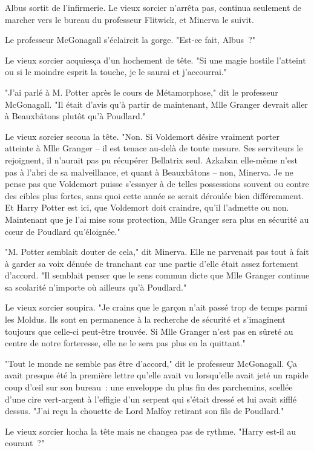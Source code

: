 Albus sortit de l'infirmerie. Le vieux sorcier n'arrêta pas, continua seulement de marcher vers le bureau du professeur Flitwick, et Minerva le suivit.

Le professeur McGonagall s'éclaircit la gorge. "Est-ce fait, Albus~?"

Le vieux sorcier acquiesça d'un hochement de tête. "Si une magie hostile l'atteint ou si le moindre esprit la touche, je le saurai et j'accourrai."

"J'ai parlé à M. Potter après le cours de Métamorphose," dit le professeur McGonagall. "Il était d'avis qu'à partir de maintenant, Mlle Granger devrait aller à Beauxbâtons plutôt qu'à Poudlard."

Le vieux sorcier secoua la tête. "Non. Si Voldemort désire vraiment porter atteinte à Mlle Granger -- il est tenace au-delà de toute mesure. Ses serviteurs le rejoignent, il n'aurait pas pu récupérer Bellatrix seul. Azkaban elle-même n'est pas à l'abri de sa malveillance, et quant à Beauxbâtons -- non, Minerva. Je ne pense pas que Voldemort puisse s'essayer à de telles possessions souvent ou contre des cibles plus fortes, sans quoi cette année se serait déroulée bien différemment. Et Harry Potter est ici, que Voldemort doit craindre, qu'il l'admette ou non. Maintenant que je l'ai mise sous protection, Mlle Granger sera plus en sécurité au cœur de Poudlard qu'éloignée."

"M. Potter semblait douter de cela," dit Minerva. Elle ne parvenait pas tout à fait à garder sa voix dénuée de tranchant car une partie d'elle était assez fortement d'accord. "Il semblait penser que le sens commun dicte que Mlle Granger continue sa scolarité n'importe où ailleurs qu'à Poudlard."

Le vieux sorcier soupira. "Je crains que le garçon n'ait passé trop de temps parmi les Moldus. Ils sont en permanence à la recherche de sécurité et s'imaginent toujours que celle-ci peut-être trouvée. Si Mlle Granger n'est pas en sûreté au centre de notre forteresse, elle ne le sera pas plus en la quittant."

"Tout le monde ne semble pas être d'accord," dit le professeur McGonagall. Ça avait presque été la première lettre qu'elle avait vu lorsqu'elle avait jeté un rapide coup d'œil sur son bureau~: une enveloppe du plus fin des parchemins, scellée d'une cire vert-argent à l'effigie d'un serpent qui s'était dressé et lui avait sifflé dessus. "J'ai reçu la chouette de Lord Malfoy retirant son fils de Poudlard."

Le vieux sorcier hocha la tête mais ne changea pas de rythme. "Harry est-il au courant~?"

